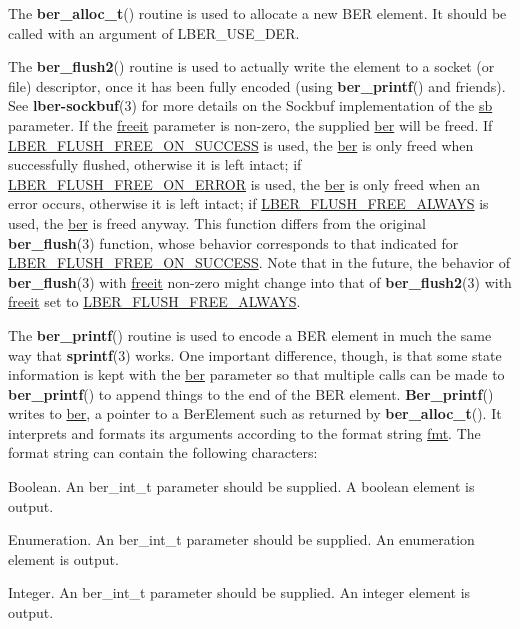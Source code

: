 \documentclass[]{article}
\let\realtextbf=\textbf
\renewcommand{\textbf}[1]{\textcolor{boldcolor}{\realtextbf{#1}}}
\renewcommand{\emph}[1]{\underline{#1}}
\begin{document}
The \textbf{ber\_alloc\_t}() routine is used to allocate a new BER
element. It should be called with an argument of LBER\_USE\_DER.

The \textbf{ber\_flush2}() routine is used to actually write the element
to a socket (or file) descriptor, once it has been fully encoded (using
\textbf{ber\_printf}() and friends). See \textbf{lber-sockbuf}(3) for
more details on the Sockbuf implementation of the \emph{sb} parameter.
If the \emph{freeit} parameter is non-zero, the supplied \emph{ber} will
be freed. If \emph{LBER\_FLUSH\_FREE\_ON\_SUCCESS} is used, the
\emph{ber} is only freed when successfully flushed, otherwise it is left
intact; if \emph{LBER\_FLUSH\_FREE\_ON\_ERROR} is used, the \emph{ber}
is only freed when an error occurs, otherwise it is left intact; if
\emph{LBER\_FLUSH\_FREE\_ALWAYS} is used, the \emph{ber} is freed
anyway. This function differs from the original \textbf{ber\_flush}(3)
function, whose behavior corresponds to that indicated for
\emph{LBER\_FLUSH\_FREE\_ON\_SUCCESS}. Note that in the future, the
behavior of \textbf{ber\_flush}(3) with \emph{freeit} non-zero might
change into that of \textbf{ber\_flush2}(3) with \emph{freeit} set to
\emph{LBER\_FLUSH\_FREE\_ALWAYS}.

The \textbf{ber\_printf}() routine is used to encode a BER element in
much the same way that \textbf{sprintf}(3) works. One important
difference, though, is that some state information is kept with the
\emph{ber} parameter so that multiple calls can be made to
\textbf{ber\_printf}() to append things to the end of the BER element.
\textbf{Ber\_printf}() writes to \emph{ber}, a pointer to a BerElement
such as returned by \textbf{ber\_alloc\_t}(). It interprets and formats
its arguments according to the format string \emph{fmt}. The format
string can contain the following characters:

\begin{description}
\itemsep1pt\parskip0pt
\item[\textbf{b}]
Boolean. An ber\_int\_t parameter should be supplied. A boolean element
is output.
\end{description}

\begin{description}
\itemsep1pt\parskip0pt
\item[\textbf{e}]
Enumeration. An ber\_int\_t parameter should be supplied. An enumeration
element is output.
\end{description}

\begin{description}
\itemsep1pt\parskip0pt
\item[\textbf{i}]
Integer. An ber\_int\_t parameter should be supplied. An integer element
is output.
\end{description}
\end{document}
